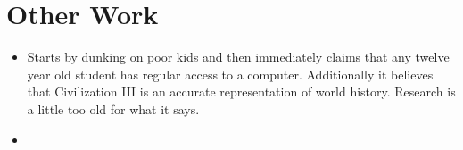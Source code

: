 \documentclass[12pt]{article}
\begin{document}
\section{Other Work}

\begin{itemize}
\item\cite{squire2008designing} Starts by dunking on poor kids and then immediately claims that any twelve year old student has regular access to a computer. Additionally it believes that Civilization III is an accurate representation of world history. Research is a little too old for what it says.

\item\cite{lopez2021robotics}
\end{itemize}

\nocite{*}



\end{document}
